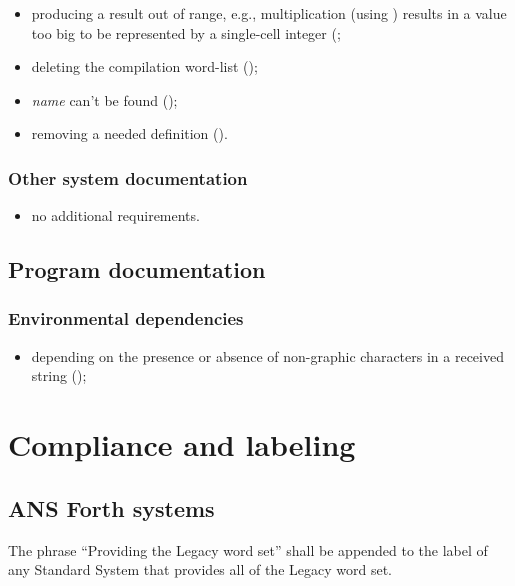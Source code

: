\begin{itemize}
\item producing a result out of range, e.g., multiplication
	(using \word{*}) results in a value too big to be represented by
	a single-cell integer
	(;
\item deleting the compilation word-list ();
\item \emph{name} can't be found ();
\item removing a needed definition ().
\end{itemize}

\subsubsection{Other system documentation} %

\begin{itemize}
\item no additional requirements.
\end{itemize}

\subsection{Program documentation} %

\subsubsection{Environmental dependencies} %

\begin{itemize}
\item depending on the presence or absence of non-graphic characters
	in a received string ();
\end{itemize}


\section{Compliance and labeling} %

\cbstart{}
\subsection[Forth systems]{ANS Forth systems} %
\cbend

The phrase ``Providing the Legacy word set'' shall be appended to
the label of any Standard System that provides all of the Legacy
word set.

